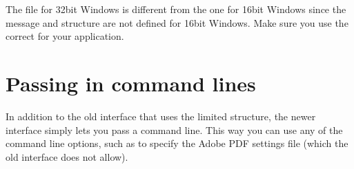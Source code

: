 \documentclass[letterpaper,12pt,english,openany,oneside]{sphinxmanual}
\begin{document}
\begin{sphinxVerbatim}[commandchars=\\\{\}]
 
  
     

    
           
           
           
           
    
          
      
\end{sphinxVerbatim}

The  file for 32\sphinxhyphen{}bit Windows is different from the one for 16\sphinxhyphen{}bit Windows since the  message and  structure are not defined for 16\sphinxhyphen{}bit Windows. Make sure you use the correct  for your application.


\section{Passing in command lines}
\label{\detokenize{Distiller_WinIntro:passing-in-command-lines}}
In addition to the old  interface that uses the limited  structure, the newer  interface simply lets you pass a command line. This way you can use any of the command line options, such as  to specify the Adobe PDF settings file (which the old  interface does not allow).
\end{document}
